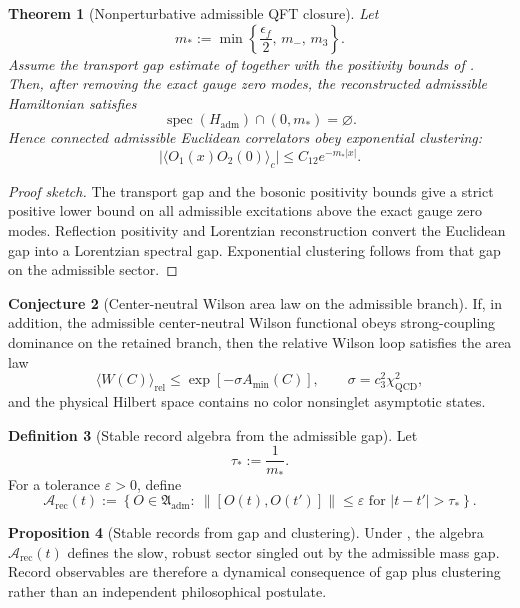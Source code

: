 \documentclass[11pt,a4paper]{article}
\newtheorem{theorem}{Theorem}[section]
\theoremstyle{definition}
\newtheorem{definition}[theorem]{Definition}
\newtheorem{conjecture}[theorem]{Conjecture}
\newtheorem{proposition}[theorem]{Proposition}
\theoremstyle{remark}
\newcommand{\cthree}{c_3}
\newcommand{\QCD}{\mathrm{QCD}}
\newcommand{\Arec}{\mathcal A_{\mathrm{rec}}}
\begin{document}
\begin{theorem}[Nonperturbative admissible QFT closure]
\label{thm:nonperturbative-admissible-qft}
Let
\[
m_*:=\min\left\{\frac{\epsilon_f}{2},\,m_-,\,m_3\right\}.
\]
Assume the transport gap estimate of  together with the positivity bounds of . Then, after removing the exact gauge zero modes, the reconstructed admissible Hamiltonian satisfies
\[
\operatorname{spec}(H_{\mathrm{adm}})\cap(0,m_*)=\varnothing.
\]
Hence connected admissible Euclidean correlators obey exponential clustering:
\[
\bigl|\langle O_1(x)O_2(0)\rangle_c\bigr|
\le
C_{12}e^{-m_*|x|}.
\]
\end{theorem}

\begin{proof}[Proof sketch]
The transport gap and the bosonic positivity bounds give a strict positive lower bound on all admissible excitations above the exact gauge zero modes. Reflection positivity and Lorentzian reconstruction convert the Euclidean gap into a Lorentzian spectral gap. Exponential clustering follows from that gap on the admissible sector.
\end{proof}

\begin{conjecture}[Center-neutral Wilson area law on the admissible branch]
If, in addition, the admissible center-neutral Wilson functional obeys strong-coupling dominance on the retained branch, then the relative Wilson loop satisfies the area law
\[
\langle W(C)\rangle_{\mathrm{rel}}
\le
\exp[-\sigma A_{\min}(C)],
\qquad
\sigma=\cthree^2\chi_{\QCD}^2,
\]
and the physical Hilbert space contains no color nonsinglet asymptotic states.
\end{conjecture}

\begin{definition}[Stable record algebra from the admissible gap]
\label{def:stable-record-algebra}
Let
\[
\tau_*:=\frac{1}{m_*}.
\]
For a tolerance $\varepsilon>0$, define
\[
\Arec(t)
:=
\left\{
O\in\mathfrak A_{\mathrm{adm}}
:\ \|[O(t),O(t')]\|\le\varepsilon
\text{ for } |t-t'|>\tau_*
\right\}.
\]
\end{definition}

\begin{proposition}[Stable records from gap and clustering]
Under , the algebra $\Arec(t)$ defines the slow, robust sector singled out by the admissible mass gap. Record observables are therefore a dynamical consequence of gap plus clustering rather than an independent philosophical postulate.
\end{proposition}
\end{document}
